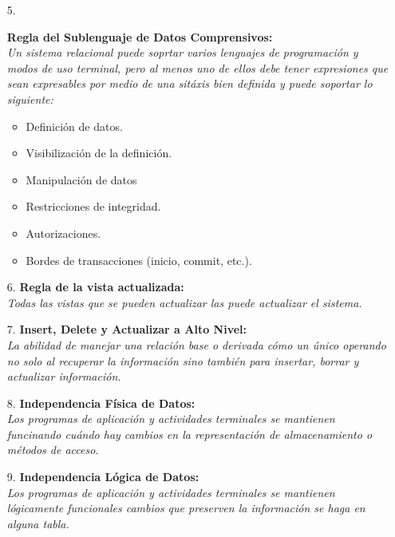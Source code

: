 \documentclass[a4paper, 12pt]{report}
\begin{document}
{\begin{enumerate}
{    \textit{En el nivel lógico, la descripción de la base de datos está
    representada al mismo nivel que los datos ordinarios. De esta manera, los
    usuarios autorizados pueden usar el mismo lenguaje relacional que se usa
    para datos regulares.}\\
}
\item[5.]{\textbf{Regla del Sublenguaje de Datos Comprensivos:}\\
    \textit{
    Un sistema relacional puede soprtar varios lenguajes de programación y modos
    de uso terminal, pero al menos uno de ellos debe tener expresiones que sean
    expresables por medio de una sitáxis bien definida y puede soportar lo
    siguiente:}\\
    \begin{itemize}
        \item{Definición de datos.}
        \item{Visibilización de la definición.}
        \item{Manipulación de datos}
        \item{Restricciones de integridad.}
        \item{Autorizaciones.}
        \item{Bordes de transacciones (inicio, commit, etc.).}
    \end{itemize}
}
\item[6.]{\textbf{Regla de la vista actualizada:}\\\textit{
    Todas las vistas que se pueden actualizar las puede actualizar el sistema.}
}
\item[7.]{\textbf{Insert, Delete y Actualizar a Alto Nivel:}\\\textit{
    La abilidad de manejar una relación base o derivada cómo un único operando
    no solo al recuperar la información sino también para insertar, borrar y
    actualizar información.}\\
}
\item[8.]{\textbf{Independencia Física de Datos:}\\\textit{
    Los programas de aplicación y actividades terminales se mantienen funcinando
    cuándo hay cambios en la representación de almacenamiento o métodos de
    acceso.}\\
}
\item[9.]{\textbf{Independencia Lógica de Datos:}\\\textit{
    Los programas de aplicación y actividades terminales se mantienen lógicamente
    funcionales cambios que preserven la información se haga en alguna tabla.}\\
}
\end{enumerate}}
\end{document}

